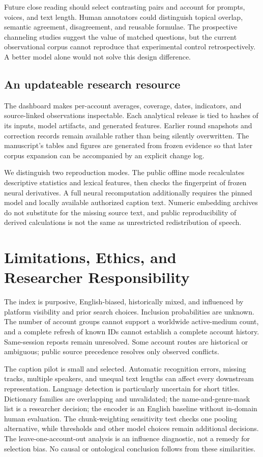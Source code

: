 Future close reading should select contrasting pairs and account for prompts, voices, and text length. Human annotators could distinguish topical overlap, semantic agreement, disagreement, and reusable formulae. The prospective channeling studies suggest the value of matched questions, but the current observational corpus cannot reproduce that experimental control retrospectively. A better model alone would not solve this design difference.

\subsection{An updateable research resource}
The dashboard makes per-account averages, coverage, dates, indicators, and source-linked observations inspectable. Each analytical release is tied to hashes of its inputs, model artifacts, and generated features. Earlier round snapshots and correction records remain available rather than being silently overwritten. The manuscript's tables and figures are generated from frozen evidence so that later corpus expansion can be accompanied by an explicit change log.

We distinguish two reproduction modes. The public offline mode recalculates descriptive statistics and lexical features, then checks the fingerprint of frozen neural derivatives. A full neural recomputation additionally requires the pinned model and locally available authorized caption text. Numeric embedding archives do not substitute for the missing source text, and public reproducibility of derived calculations is not the same as unrestricted redistribution of speech.

\section{Limitations, Ethics, and Researcher Responsibility}
The index is purposive, English-biased, historically mixed, and influenced by platform visibility and prior search choices. Inclusion probabilities are unknown. The number of account groups cannot support a worldwide active-medium count, and a complete refresh of known IDs cannot establish a complete account history. Same-session reposts remain unresolved. Some account routes are historical or ambiguous; public source precedence resolves only observed conflicts.

The caption pilot is small and selected. Automatic recognition errors, missing tracks, multiple speakers, and unequal text lengths can affect every downstream representation. Language detection is particularly uncertain for short titles. Dictionary families are overlapping and unvalidated; the name-and-genre-mask list is a researcher decision; the encoder is an English baseline without in-domain human evaluation. The chunk-weighting sensitivity test checks one pooling alternative, while thresholds and other model choices remain additional decisions. The leave-one-account-out analysis is an influence diagnostic, not a remedy for selection bias. No causal or ontological conclusion follows from these similarities.

